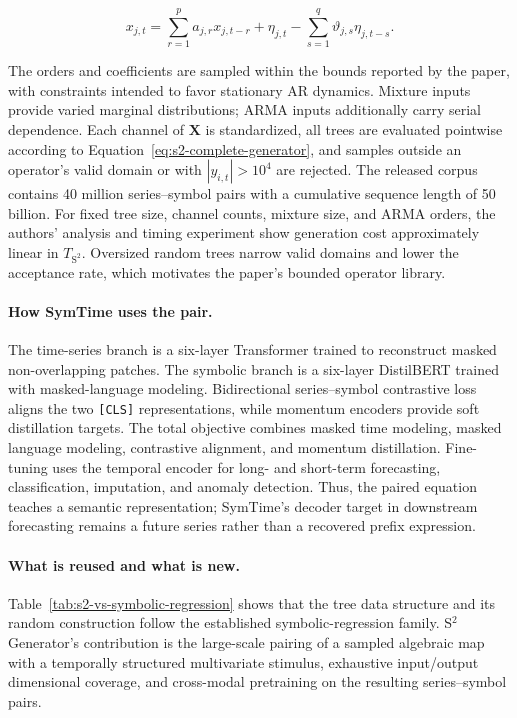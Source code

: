 \begin{equation}
x_{j,t}=\sum_{r=1}^{p}a_{j,r}x_{j,t-r}
          +\eta_{j,t}
          -\sum_{s=1}^{q}\vartheta_{j,s}\eta_{j,t-s}.
\label{eq:s2-arma-input}
\end{equation}

The orders and coefficients are sampled within the bounds reported by the
paper, with constraints intended to favor stationary AR dynamics. Mixture
inputs provide varied marginal distributions; ARMA inputs additionally carry
serial dependence. Each channel of $\mathbf X$ is standardized, all trees are
evaluated pointwise according to Equation~\eqref{eq:s2-complete-generator},
and samples outside an operator's valid domain or with
$|y_{i,t}|>10^4$ are rejected. The released corpus contains 40 million
series--symbol pairs with a cumulative sequence length of 50 billion. For
fixed tree size, channel counts, mixture size, and ARMA orders, the authors'
analysis and timing experiment show generation cost approximately linear in
$T_{\mathrm{S^2}}$. Oversized random trees narrow valid domains and lower the
acceptance rate, which motivates the paper's bounded operator library.

\paragraph{How SymTime uses the pair.}
The time-series branch is a six-layer Transformer trained to reconstruct
masked non-overlapping patches. The symbolic branch is a six-layer DistilBERT
trained with masked-language modeling. Bidirectional series--symbol contrastive
loss aligns the two \texttt{[CLS]} representations, while momentum encoders
provide soft distillation targets. The total objective combines masked time
modeling, masked language modeling, contrastive alignment, and momentum
distillation. Fine-tuning uses the temporal encoder for long- and short-term
forecasting, classification, imputation, and anomaly detection. Thus, the
paired equation teaches a semantic representation; SymTime's decoder target
in downstream forecasting remains a future series rather than a recovered
prefix expression.

\paragraph{What is reused and what is new.}
Table~\ref{tab:s2-vs-symbolic-regression} shows that the tree data structure
and its random construction follow the established symbolic-regression
family. S$^2$Generator's contribution is the large-scale pairing of a sampled
algebraic map with a temporally structured multivariate stimulus, exhaustive
input/output dimensional coverage, and cross-modal pretraining on the
resulting series--symbol pairs.

